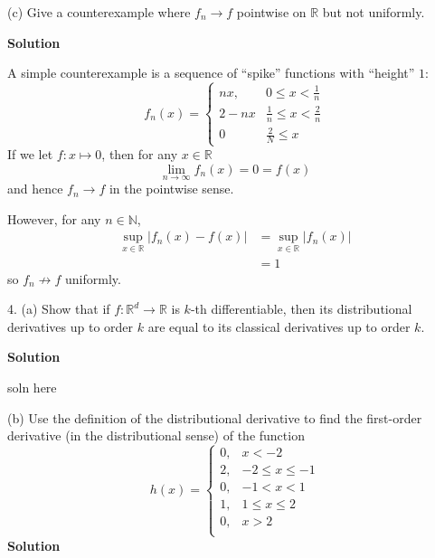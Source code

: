 \documentclass{article}
\begin{document}
\vspace{5mm}

(c) Give a counterexample where $f_n \to f$ pointwise on
$\mathbb{R}$ but not uniformly.

\textbf{Solution}

A simple counterexample is a sequence of ``spike'' functions with
``height'' $1$:
%
\begin{equation*}
    f_n(x) =
        \begin{cases}
            n x, & 0 \leq x < \frac{1}{n} \\
            2 - n x & \frac{1}{n} \leq x < \frac{2}{n} \\
            0 & \frac{2}{N} \leq x
        \end{cases}
\end{equation*}
%
If we let $f: x \mapsto 0$, then for any $x \in \mathbb{R}$
%
\begin{equation*}
    \lim_{n \to \infty} f_n(x) = 0 = f(x)
\end{equation*}
%
and hence $f_n \to f$ in the pointwise sense.

However, for any $n \in \mathbb{N}$,
%
\begin{align*}
    \sup_{x \in \mathbb{R}} |f_n(x) - f(x)|
        &= \sup_{x \in \mathbb{R}} |f_n(x)| \\
        &= 1
\end{align*}
%
so $f_n \not\to f$ uniformly.

\newpage

4. (a) Show that if $f : \mathbb{R}^{d} \rightarrow \mathbb{R}$ is
$k$-th differentiable, then its distributional derivatives up to order
$k$ are equal to its classical derivatives up to order $k$.

\textbf{Solution}

soln here

\vspace{5mm}

(b) Use the definition of the distributional derivative to find the
first-order derivative (in the distributional sense) of the function
%
\begin{equation*}
    h(x) =
        \begin{cases}
            0, & x < -2 \\
            2, & -2 \leq x \leq -1 \\
            0, & -1 < x < 1 \\
            1, & 1 \leq x \leq 2 \\
            0, & x > 2 \\
        \end{cases}
\end{equation*}
%
\textbf{Solution}
\end{document}
